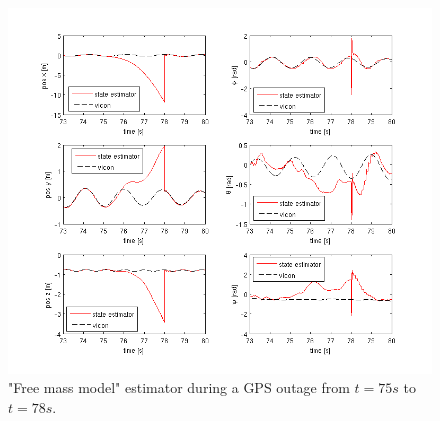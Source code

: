 \begin{figure}[hb]
\centering
\includegraphics[width=1\textwidth]{pictures/2_2_fmm_SNR5_detail_GPSoutage.png}
\caption{"Free mass model" estimator during a GPS outage from $t=75 s$ to $t=78 s$.}
\label{detail_fmm_outage}
\end{figure}


